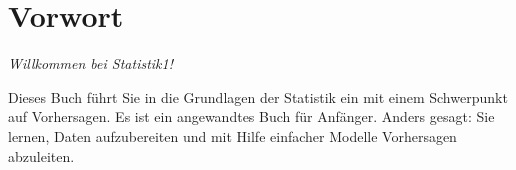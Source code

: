 \documentclass[
  letterpaper,
  oneside,
  open=any]{scrbook}
\theoremstyle{definition}
\theoremstyle{definition}
\theoremstyle{definition}
\theoremstyle{remark}
\begin{document}
\begin{frontmatter}
\begin{titlepage}
\newcommand{\authorblock}{{\titlepageauthorblock}

\vspace{2\baselineskip}
}

\newcommand{\affiliationblock}{{\titlepageaffiliationblock}

\vspace{0pt}
}

\newcommand{\logoblock}{}

\newcommand{\footerblock}{{\titlepagefooterblock}

\vspace{0pt}
}

\newcommand{\dateblock}{{\titlepagedateblock}

\vspace{0pt}
}

\newcommand{\headerblock}{}

\thispagestyle{empty} %


\newlength{\minipagewidth}
\setlength{\minipagewidth}{\textwidth}
\raggedright %
\begin{minipage}[b][\textheight][s]{\minipagewidth}
\titlepagepagealign
\titleblock

\authorblock

\vfill

\logoblock

\footerblock
\par

\end{minipage}
\clearpage
\end{titlepage}
\setcounter{page}{1}
\end{frontmatter}



\mainmatter
{}

\chapter*{Vorwort}\label{vorwort}


\emph{Willkommen bei Statistik1!}

Dieses Buch führt Sie in die Grundlagen der Statistik ein mit einem
Schwerpunkt auf Vorhersagen. Es ist ein angewandtes Buch für Anfänger.
Anders gesagt: Sie lernen, Daten aufzubereiten und mit Hilfe einfacher
Modelle Vorhersagen abzuleiten.
\end{document}
